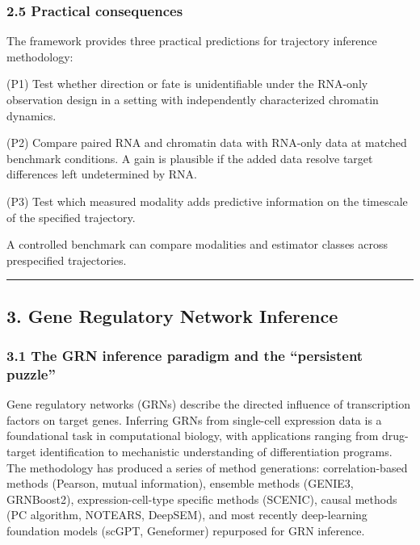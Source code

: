 \documentclass[
]{article}
\begin{document}
\hypertarget{practical-consequences}{%
\subsubsection{2.5 Practical
consequences}\label{practical-consequences}}

The framework provides three practical predictions for trajectory
inference methodology:

(P1) Test whether direction or fate is unidentifiable under the RNA-only
observation design in a setting with independently characterized
chromatin dynamics.

(P2) Compare paired RNA and chromatin data with RNA-only data at matched
benchmark conditions. A gain is plausible if the added data resolve
target differences left undetermined by RNA.

(P3) Test which measured modality adds predictive information on the
timescale of the specified trajectory.

A controlled benchmark can compare modalities and estimator classes
across prespecified trajectories.

\begin{center}\rule{0.5\linewidth}{0.5pt}\end{center}

\hypertarget{gene-regulatory-network-inference}{%
\subsection{3. Gene Regulatory Network
Inference}\label{gene-regulatory-network-inference}}

\hypertarget{the-grn-inference-paradigm-and-the-persistent-puzzle}{%
\subsubsection{3.1 The GRN inference paradigm and the ``persistent
puzzle''}\label{the-grn-inference-paradigm-and-the-persistent-puzzle}}

Gene regulatory networks (GRNs) describe the directed influence of
transcription factors on target genes. Inferring GRNs from single-cell
expression data is a foundational task in computational biology, with
applications ranging from drug-target identification to mechanistic
understanding of differentiation programs. The methodology has produced
a series of method generations: correlation-based methods (Pearson,
mutual information), ensemble methods (GENIE3, GRNBoost2),
expression-cell-type specific methods (SCENIC), causal methods (PC
algorithm, NOTEARS, DeepSEM), and most recently deep-learning foundation
models (scGPT, Geneformer) repurposed for GRN inference.
\end{document}
